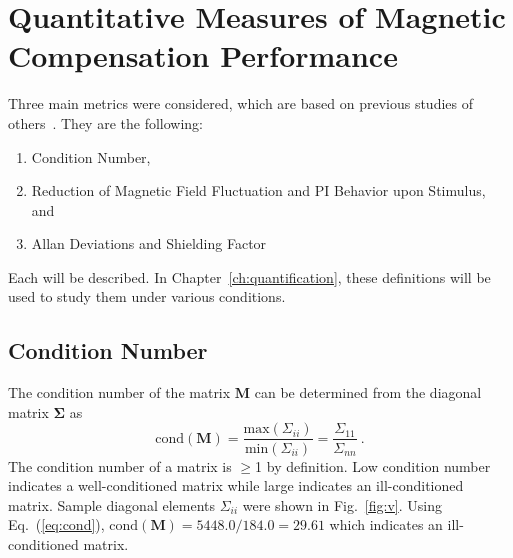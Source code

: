  
% 





\section{Quantitative Measures of Magnetic Compensation Performance\label{sec:metrics}}
Three main metrics were considered, which are based on previous studies of others~\cite{bea,lins,rawlik}. They are the following:

\begin{enumerate}
    \item Condition Number,
    \item Reduction of Magnetic Field Fluctuation and PI Behavior upon Stimulus, and
    \item Allan Deviations and Shielding Factor
\end{enumerate}

Each will be described. In Chapter~\ref{ch:quantification}, these definitions will be used to study them under various conditions.

\subsection{Condition Number}


The condition number of the matrix $\bm{M}$ can be determined from the diagonal matrix $\bm{\Sigma}$ as 
 \begin{equation}\label{eq:cond}
     \mathrm{cond}(\bm{M})=\frac{\mathrm{max}(\Sigma_{ii})}{\mathrm{min}(\Sigma_{ii})}=\frac{\Sigma_{11}}{\Sigma_{nn}}~\text{.}
 \end{equation}
The condition number of a matrix is $\geq$1 by definition. Low condition number indicates a well-conditioned matrix while large indicates an ill-conditioned matrix. Sample diagonal elements $\Sigma_{ii}$ were shown in Fig.~\ref{fig:v}. Using Eq.~(\ref{eq:cond}),  $\mathrm{cond}(\bm{M})=5448.0/184.0=29.61$ which indicates an ill-conditioned matrix. 

